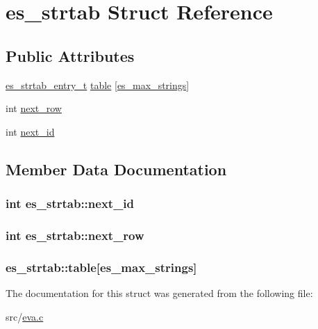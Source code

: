 \hypertarget{structes__strtab}{\section{es\-\_\-strtab Struct Reference}
\label{structes__strtab}
}
\subsection*{Public Attributes}
\begin{DoxyCompactItemize}
\item 
\hyperlink{eva_8c_a4340da25984d6a8c325cf07c660c32e5}{es\-\_\-strtab\-\_\-entry\-\_\-t} \hyperlink{structes__strtab_a8d275bbd9675d6f31d5ab773db2175d4}{table} \mbox{[}\hyperlink{eva_8c_a06fc87d81c62e9abb8790b6e5713c55baff58a47b7788413e03dc0e66223ae97f}{es\-\_\-max\-\_\-strings}\mbox{]}
\item 
int \hyperlink{structes__strtab_a770a5df3359a47fa24e995b3d69c104b}{next\-\_\-row}
\item 
int \hyperlink{structes__strtab_a48f8e3d9ee7c880b7f3ae7a824ba9e4a}{next\-\_\-id}
\end{DoxyCompactItemize}


\subsection{Member Data Documentation}
\hypertarget{structes__strtab_a48f8e3d9ee7c880b7f3ae7a824ba9e4a}{
\subsubsection[{next\-\_\-id}]{\setlength{\rightskip}{0pt plus 5cm}int es\-\_\-strtab\-::next\-\_\-id}}\label{structes__strtab_a48f8e3d9ee7c880b7f3ae7a824ba9e4a}
\hypertarget{structes__strtab_a770a5df3359a47fa24e995b3d69c104b}{
\subsubsection[{next\-\_\-row}]{\setlength{\rightskip}{0pt plus 5cm}int es\-\_\-strtab\-::next\-\_\-row}}\label{structes__strtab_a770a5df3359a47fa24e995b3d69c104b}
\hypertarget{structes__strtab_a8d275bbd9675d6f31d5ab773db2175d4}{
\subsubsection[{table}]{ es\-\_\-strtab\-::table\mbox{[}{\bf es\-\_\-max\-\_\-strings}\mbox{]}}}\label{structes__strtab_a8d275bbd9675d6f31d5ab773db2175d4}


The documentation for this struct was generated from the following file\-:\begin{DoxyCompactItemize}
\item 
src/\hyperlink{eva_8c}{eva.\-c}\end{DoxyCompactItemize}
